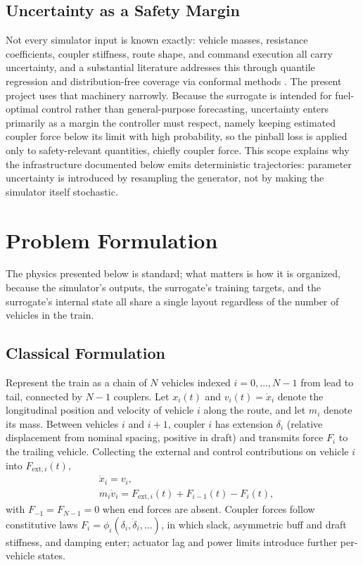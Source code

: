 \documentclass[numbered]{trbunofficial}
\begin{document}
\subsection{Uncertainty as a Safety Margin}

Not every simulator input is known exactly: vehicle masses, resistance coefficients, coupler stiffness, route shape, and command execution all carry uncertainty, and a substantial literature addresses this through quantile regression \citep{koenker1978regression} and distribution-free coverage via conformal methods \citep{romano2019conformalized}. The present project uses that machinery narrowly. Because the surrogate is intended for fuel-optimal control rather than general-purpose forecasting, uncertainty enters primarily as a margin the controller must respect, namely keeping estimated coupler force below its limit with high probability, so the pinball loss is applied only to safety-relevant quantities, chiefly coupler force. This scope explains why the infrastructure documented below emits deterministic trajectories: parameter uncertainty is introduced by resampling the generator, not by making the simulator itself stochastic.

\section{Problem Formulation}\label{sec:problem}

The physics presented below is standard; what matters is how it is organized, because the simulator's outputs, the surrogate's training targets, and the surrogate's internal state all share a single layout regardless of the number of vehicles in the train.

\subsection{Classical Formulation}

Represent the train as a chain of $N$ vehicles indexed $i = 0,\ldots,N-1$ from lead to tail, connected by $N-1$ couplers. Let $x_i(t)$ and $v_i(t) = \dot{x}_i$ denote the longitudinal position and velocity of vehicle $i$ along the route, and let $m_i$ denote its mass. Between vehicles $i$ and $i+1$, coupler $i$ has extension $\delta_i$ (relative displacement from nominal spacing, positive in draft) and transmits force $F_i$ to the trailing vehicle. Collecting the external and control contributions on vehicle $i$ into $F_{\mathrm{ext},i}(t)$,
\begin{align}
  & \dot{x}_i = v_i, \\
  & m_i \dot{v}_i = F_{\mathrm{ext},i}(t) + F_{i-1}(t) - F_i(t),
  \label{eq:classical}
\end{align}
with $F_{-1} = F_{N-1} = 0$ when end forces are absent. Coupler forces follow constitutive laws $F_i = \phi_i(\delta_i, \dot{\delta}_i,\ldots)$, in which slack, asymmetric buff and draft stiffness, and damping enter; actuator lag and power limits introduce further per-vehicle states.
\end{document}
